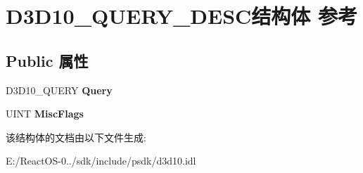 \hypertarget{struct_d3_d10___q_u_e_r_y___d_e_s_c}{}\section{D3\+D10\+\_\+\+Q\+U\+E\+R\+Y\+\_\+\+D\+E\+S\+C结构体 参考}
\label{struct_d3_d10___q_u_e_r_y___d_e_s_c}
\subsection*{Public 属性}
\begin{DoxyCompactItemize}
\item 
\mbox{\label{struct_d3_d10___q_u_e_r_y___d_e_s_c_a7d7ff924f665906e37a0dc0a4aacd81c}} 
D3\+D10\+\_\+\+Q\+U\+E\+RY {\bfseries Query}
\item 
\mbox{\label{struct_d3_d10___q_u_e_r_y___d_e_s_c_a520703be0c78b58c92728d96f004892c}} 
U\+I\+NT {\bfseries Misc\+Flags}
\end{DoxyCompactItemize}


该结构体的文档由以下文件生成\+:\begin{DoxyCompactItemize}
\item 
E\+:/\+React\+O\+S-\/0../sdk/include/psdk/d3d10.\+idl\end{DoxyCompactItemize}
